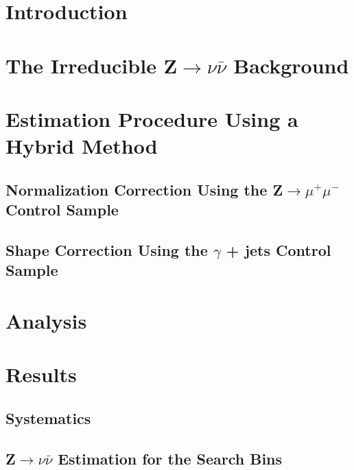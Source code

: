 \section{Introduction}



\section{The Irreducible Z$\rightarrow\nu\bar{\nu}$ Background}
\section{Estimation Procedure Using a Hybrid Method}
\subsection{Normalization Correction Using the Z$\rightarrow\mu^{+}\mu^{-}$ Control Sample}
\subsection{Shape Correction Using the $\gamma$ + jets Control Sample}
\section{Analysis}
\section{Results}
\subsection{Systematics}
\subsection{Z$\rightarrow\nu\bar{\nu}$ Estimation for the Search Bins}